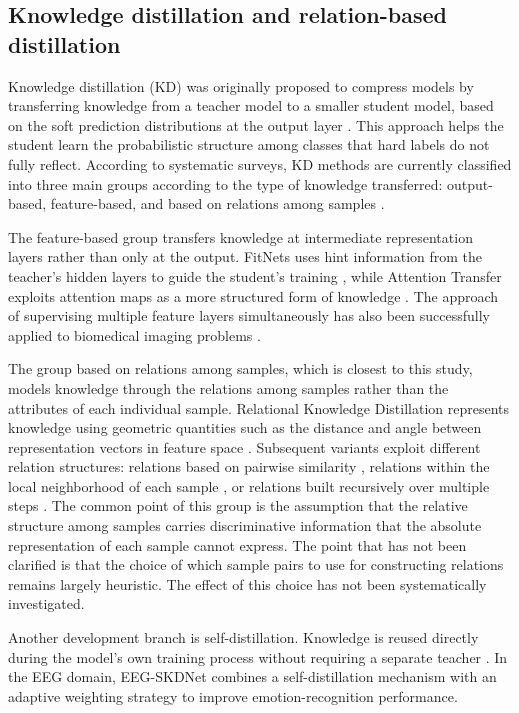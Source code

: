 \subsection{Knowledge distillation and relation-based distillation}
\label{sec:kd}

Knowledge distillation (KD) was originally proposed to compress
models by transferring knowledge from a teacher model to a smaller
student model, based on the soft prediction distributions at the
output layer \cite{hinton2015distilling}. This approach helps the
student learn the probabilistic structure among classes that hard
labels do not fully reflect. According to systematic surveys, KD
methods are currently classified into three main groups according to
the type of knowledge transferred: output-based, feature-based, and
based on relations among samples \cite{gou2021knowledge,mansourian2025comprehensive}.

The feature-based group transfers knowledge at intermediate
representation layers rather than only at the output. FitNets uses
hint information from the teacher's hidden layers to guide the
student's training \cite{romero2015fitnets}, while Attention Transfer
exploits attention maps as a more structured form of knowledge
\cite{zagoruyko2017paying}. The approach of supervising multiple
feature layers simultaneously has also been successfully applied to
biomedical imaging problems \cite{javed2023knowledge}.

The group based on relations among samples, which is closest to this
study, models knowledge through the relations among samples rather
than the attributes of each individual sample. Relational Knowledge
Distillation represents knowledge using geometric quantities such as
the distance and angle between representation vectors in feature
space \cite{park2019relational}. Subsequent variants exploit
different relation structures: relations based on pairwise similarity
\cite{feng2021double}, relations within the local neighborhood of
each sample \cite{gou2025neighborhood}, or relations built
recursively over multiple steps \cite{ye2021unsupervised}. The common
point of this group is the assumption that the relative structure
among samples carries discriminative information that the absolute
representation of each sample cannot express. The point that has not
been clarified is that the choice of which sample pairs to use for
constructing relations remains largely heuristic. The effect of this
choice has not been systematically investigated.

Another development branch is self-distillation. Knowledge is reused
directly during the model's own training process without requiring a
separate teacher \cite{zhang2019be}. In the EEG domain, EEG-SKDNet
\cite{mai2025eegskdnet} combines a self-distillation mechanism with
an adaptive weighting strategy to improve emotion-recognition
performance.


